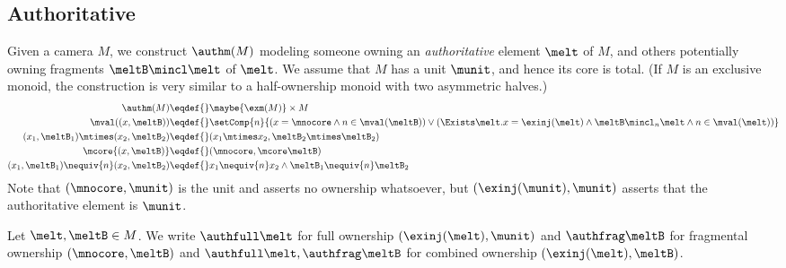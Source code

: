 



\subsection{Authoritative}
\label{sec:auth-camera}

Given a camera $M$, we construct $\authm(M)$ modeling someone owning an \emph{authoritative} element $\melt$ of $M$, and others potentially owning fragments $\meltB \mincl \melt$ of $\melt$.
We assume that $M$ has a unit $\munit$, and hence its core is total.
(If $M$ is an exclusive monoid, the construction is very similar to a half-ownership monoid with two asymmetric halves.)
\begin{align*}
\authm(M) \eqdef{}& \maybe{\exm(M)} \times M \\
\mval( (x, \meltB ) ) \eqdef{}& \setComp{ n }{ (x = \mnocore \land n \in \mval(\meltB)) \lor (\Exists \melt. x = \exinj(\melt) \land \meltB \mincl_n \melt \land n \in \mval(\melt)) } \\
  (x_1, \meltB_1) \mtimes (x_2, \meltB_2) \eqdef{}& (x_1 \mtimes x_2, \meltB_2 \mtimes \meltB_2) \\
  \mcore{(x, \meltB)} \eqdef{}& (\mnocore, \mcore\meltB) \\
  (x_1, \meltB_1) \nequiv{n} (x_2, \meltB_2) \eqdef{}& x_1 \nequiv{n} x_2 \land \meltB_1 \nequiv{n} \meltB_2
\end{align*}
Note that $(\mnocore, \munit)$ is the unit and asserts no ownership whatsoever, but $(\exinj(\munit), \munit)$ asserts that the authoritative element is $\munit$.

Let $\melt, \meltB \in M$.
We write $\authfull \melt$ for full ownership $(\exinj(\melt), \munit)$ and $\authfrag \meltB$ for fragmental ownership $(\mnocore, \meltB)$ and $\authfull \melt , \authfrag \meltB$ for combined ownership $(\exinj(\melt), \meltB)$.

